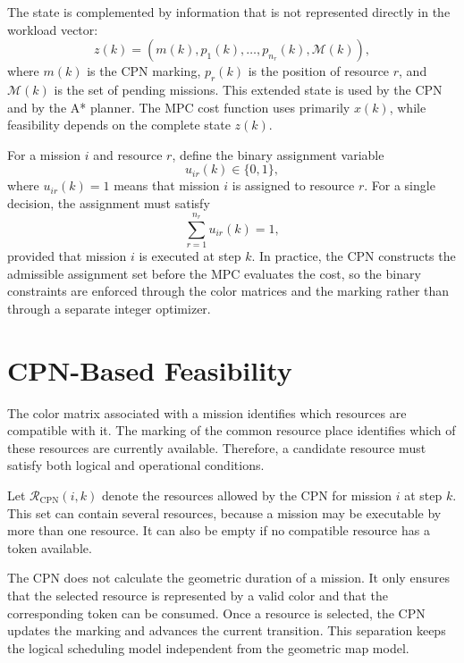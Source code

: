 The state is complemented by information that is not represented directly in
the workload vector:
\begin{equation}
	z(k) = \left(m(k),p_1(k),\ldots,p_{n_r}(k),\mathcal{M}(k)\right),
\end{equation}
where $m(k)$ is the CPN marking, $p_r(k)$ is the position of resource $r$,
and $\mathcal{M}(k)$ is the set of pending missions. This extended state is
used by the CPN and by the A* planner. The MPC cost function uses primarily
$x(k)$, while feasibility depends on the complete state $z(k)$.

For a mission $i$ and resource $r$, define the binary assignment variable
\begin{equation}
	u_{ir}(k) \in \{0,1\},
\end{equation}
where $u_{ir}(k)=1$ means that mission $i$ is assigned to resource $r$.
For a single decision, the assignment must satisfy
\begin{equation}
	\sum_{r=1}^{n_r} u_{ir}(k) = 1,
\end{equation}
provided that mission $i$ is executed at step $k$. In practice, the CPN
constructs the admissible assignment set before the MPC evaluates the cost,
so the binary constraints are enforced through the color matrices and the
marking rather than through a separate integer optimizer.

\section{CPN-Based Feasibility}

The color matrix associated with a mission identifies which resources are
compatible with it. The marking of the common resource place identifies
which of these resources are currently available. Therefore, a candidate
resource must satisfy both logical and operational conditions.

Let $\mathcal{R}_{\mathrm{CPN}}(i,k)$ denote the resources allowed by the CPN
for mission $i$ at step $k$. This set can contain several resources, because
a mission may be executable by more than one resource. It can also be empty
if no compatible resource has a token available.

The CPN does not calculate the geometric duration of a mission. It only
ensures that the selected resource is represented by a valid color and that
the corresponding token can be consumed. Once a resource is selected, the
CPN updates the marking and advances the current transition. This separation
keeps the logical scheduling model independent from the geometric map model.

